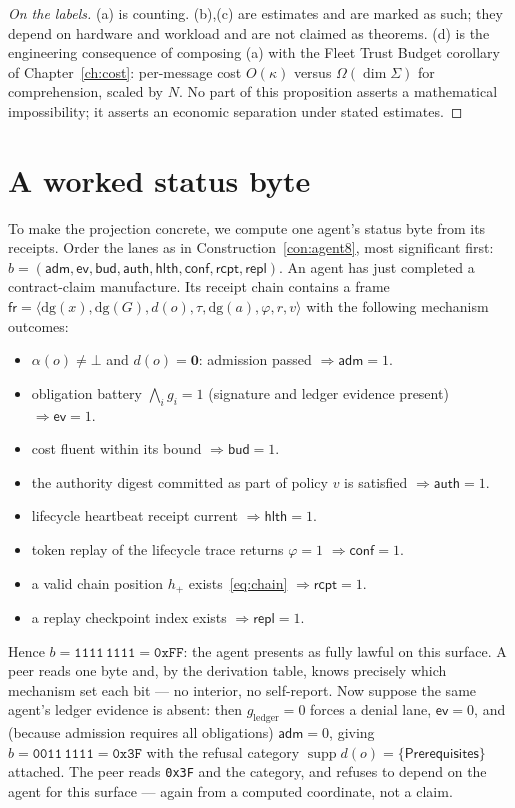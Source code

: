 \documentclass[11pt,oneside]{book}
\theoremstyle{definition}
\theoremstyle{plain}
\theoremstyle{remark}
\newcommand{\adm}{\alpha}                      %
\newcommand{\Rfsl}{\bot}                       %
\newcommand{\CL}{\kappa}                       %
\newcommand{\Fitness}{\varphi}
\newcommand{\dg}{\mathrm{dg}}                  %
\DeclareMathOperator{\supp}{supp}
\begin{document}
\begin{proof}[On the labels]
(a) is counting. (b),(c) are estimates and are marked as such; they depend on hardware and
workload and are not claimed as theorems. (d) is the engineering consequence of composing (a)
with the Fleet Trust Budget corollary of Chapter~\ref{ch:cost}: per-message cost $O(\CL)$
versus $\Omega(\dim\Sigma)$ for comprehension, scaled by $N$. No part of this proposition
asserts a mathematical impossibility; it asserts an economic separation under stated
estimates. \end{proof}

\section{A worked status byte}

To make the projection concrete, we compute one agent's status byte from its receipts.
Order the lanes as in Construction~\ref{con:agent8}, most significant first:
$b=(\textsf{adm},\textsf{ev},\textsf{bud},\textsf{auth},\textsf{hlth},\textsf{conf},\textsf{rcpt},\textsf{repl})$.
An agent has just completed a contract-claim manufacture. Its receipt chain contains a frame
$\mathsf{fr}=\langle\dg(x),\dg(G),d(o),\tau,\dg(a),\Fitness,r,v\rangle$ with the following
mechanism outcomes:
\begin{itemize}[leftmargin=1.4em,itemsep=1pt]
\item $\adm(o)\ne\Rfsl$ and $d(o)=\bm 0$: admission passed $\Rightarrow \textsf{adm}=1$.
\item obligation battery $\bigwedge_i g_i=1$ (signature and ledger evidence present)
      $\Rightarrow \textsf{ev}=1$.
\item cost fluent within its bound $\Rightarrow \textsf{bud}=1$.
\item the authority digest committed as part of policy $v$ is satisfied
      $\Rightarrow \textsf{auth}=1$.
\item lifecycle heartbeat receipt current $\Rightarrow \textsf{hlth}=1$.
\item token replay of the lifecycle trace returns $\Fitness=1$
      $\Rightarrow \textsf{conf}=1$.
\item a valid chain position $h_+$ exists~\eqref{eq:chain} $\Rightarrow \textsf{rcpt}=1$.
\item a replay checkpoint index exists $\Rightarrow \textsf{repl}=1$.
\end{itemize}
Hence $b = \mathtt{1111\,1111} = \mathtt{0xFF}$: the agent presents as fully lawful on this
surface. A peer reads one byte and, by the derivation table, knows precisely which mechanism
set each bit --- no interior, no self-report. Now suppose the same agent's ledger evidence is
absent: then $g_{\text{ledger}}=0$ forces a denial lane, $\textsf{ev}=0$, and (because
admission requires all obligations) $\textsf{adm}=0$, giving $b=\mathtt{0011\,1111}=\mathtt{0x3F}$
with the refusal category $\supp d(o)=\{\textsf{Prerequisites}\}$ attached. The peer reads
\texttt{0x3F} and the category, and refuses to depend on the agent for this surface --- again
from a computed coordinate, not a claim.
\end{document}
